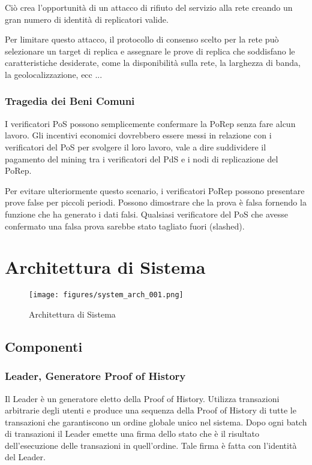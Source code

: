 \documentclass[12pt]{article}
\begin{document}
Ciò crea l'opportunità di un attacco di rifiuto del servizio alla rete creando un gran numero di identità di replicatori valide.

Per limitare questo attacco, il protocollo di consenso scelto per la rete può selezionare un target di replica e assegnare le prove di replica che soddisfano le caratteristiche desiderate, come la disponibilità sulla rete, la larghezza di banda, la geolocalizzazione, ecc ...
\subsubsection{Tragedia dei Beni Comuni}

	I verificatori PoS possono semplicemente confermare la PoRep senza fare alcun lavoro. Gli incentivi economici dovrebbero essere messi in relazione con i verificatori del PoS per svolgere il loro lavoro, vale a dire suddividere il pagamento del mining tra i verificatori del PdS e i nodi di replicazione del PoRep.
	
	Per evitare ulteriormente questo scenario, i verificatori PoRep possono presentare prove false per piccoli periodi. Possono dimostrare che la prova è falsa fornendo la funzione che ha generato i dati falsi. Qualsiasi verificatore del PoS che avesse confermato una falsa prova sarebbe stato tagliato fuori (slashed).
	
\section{Architettura di Sistema}\label{system_architecture}

\begin{figure}
  \begin{center}
    \centering
    \texttt{[image: figures/system\_arch\_001.png]}
    \caption[Fig 9]{Architettura di Sistema \label{fig_9}}
  \end{center}
  \end{figure}

\subsection{Componenti}

\subsubsection{Leader, Generatore Proof of History}
Il Leader è un generatore eletto della Proof of History. Utilizza transazioni arbitrarie degli utenti e produce una sequenza della Proof of History di tutte le transazioni che garantiscono un ordine globale unico nel sistema. Dopo ogni batch di transazioni il Leader emette una firma dello stato che è il risultato dell'esecuzione delle transazioni in quell'ordine. Tale firma è fatta con l'identità del Leader.
\end{document}

